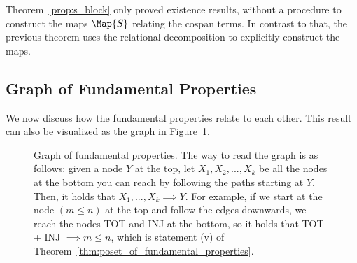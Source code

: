 \documentclass[manyauthors]{fundam}
\begin{document}
\begin{remark}
  Theorem~\ref{prop:s_block} only proved existence results,
  without a procedure to construct the maps $\Map{S}$ relating the cospan terms.
  In contrast to that, the previous theorem uses the relational decomposition
  to explicitly construct the maps.
\end{remark}


\subsection{Graph of Fundamental Properties}
\label{sec:aplications_poset_of_fundamental_properties}

We now discuss how the fundamental properties relate to each other.
This result can also be visualized as the graph in Figure~\ref{fig:poset_of_fundamental_properties}.

\begin{figure}[thb]
  \centering
  \caption{Graph of fundamental properties.
   The way to read the graph is as follows: given a node $Y$ at the top, let $X_1, X_2, ..., X_k$ be all the nodes at the bottom you can reach by following the paths starting at $Y$. Then, it holds that $X_1, ..., X_k \implies Y$. For example, if we start at the node $(m \leq n)$ at the top and follow the edges downwards, we reach the nodes TOT and INJ at the bottom, so it holds that TOT + INJ $\implies m \leq n$, which is statement (v) of Theorem~\ref{thm:poset_of_fundamental_properties}.}
  \label{fig:poset_of_fundamental_properties}
\end{figure}
\end{document}

